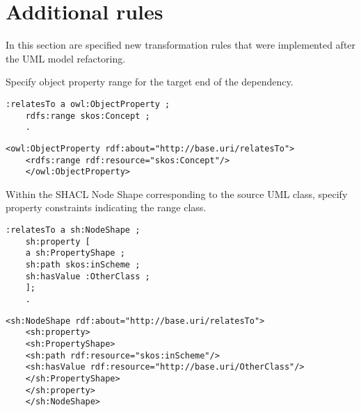 \section{Additional rules}
\label{sec:tran-rules5}

In this section are specified new transformation rules that were implemented after the UML model refactoring.


\begin{trule}
	\label{rule:dependency-uni-range-rc}	
	Specify object property range for the target end of the dependency.
\end{trule}
\vspace{-\parskip}
\begin{minipage}[b]{.385\textwidth}
	\begin{lstlisting}[language=Turtle, caption={Range specification in Turtle syntax}, captionpos=b]
	:relatesTo a owl:ObjectProperty ;
	rdfs:range skos:Concept ;
	.
	\end{lstlisting}
\end{minipage}%
\quad\vspace{-\parskip}
\begin{minipage}[b]{.6\textwidth}
	\begin{lstlisting}[language=RDF/XML, caption={Range specification in  RDF/XML syntax}, captionpos=b]
	<owl:ObjectProperty rdf:about="http://base.uri/relatesTo">
	<rdfs:range rdf:resource="skos:Concept"/>
	</owl:ObjectProperty>
	\end{lstlisting}
\end{minipage}
\vspace{-\parskip}

\begin{trule}
	\label{rule:dependency-uni-range-dc}
	Within the SHACL Node Shape corresponding to the source UML class, specify property constraints indicating the range class.
\end{trule}

\vspace{-\parskip}
\begin{minipage}[b]{.385\textwidth}
	\begin{lstlisting}[language=Turtle, caption={Property class constraint in Turtle syntax}, captionpos=b]
	:relatesTo a sh:NodeShape ;
	sh:property [
	a sh:PropertyShape ;
	sh:path skos:inScheme ;
	sh:hasValue :OtherClass ;
	];
	.    
	\end{lstlisting}
\end{minipage}%
\quad\vspace{-\parskip}
\begin{minipage}[b]{.6\textwidth}
	\begin{lstlisting}[language=RDF/XML, caption={Property class constraint in RDF/XML syntax}, captionpos=b]
	<sh:NodeShape rdf:about="http://base.uri/relatesTo">
	<sh:property>
	<sh:PropertyShape>
	<sh:path rdf:resource="skos:inScheme"/>
	<sh:hasValue rdf:resource="http://base.uri/OtherClass"/>
	</sh:PropertyShape>
	</sh:property>
	</sh:NodeShape>
	\end{lstlisting}
\end{minipage}
\vspace{-\parskip}